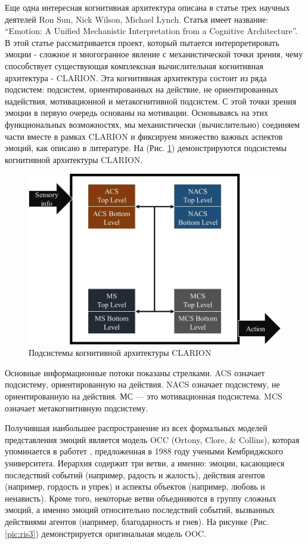 Еще одна интересная когнитивная архитектура описана в статье трех научных деятелей Ron Sun, Nick Wilson, 
Michael Lynch. Статья имеет название: “Emotion: A Unified Mechanistic Interpretation from a Cognitive Architecture”.
В этой статье рассматривается проект, который пытается интерпретировать эмоции - сложное и многогранное явление с 
механистической точки зрения, чему способствует существующая комплексная вычислительная когнитивная архитектура - CLARION.
Эта когнитивная архитектура состоит из ряда подсистем: подсистем, ориентированных на действие, не ориентированных надействия, 
мотивационной и метакогнитивной подсистем. С этой точки зрения эмоции в первую очередь основаны на мотивации.
Основываясь на этих функциональных возможностях, мы механистически (вычислительно) соединяем части вместе 
в рамках CLARION и фиксируем множество важных аспектов эмоций, как описано в литературе. 
На (Рис. \ref{pic:ris2}) демонстрируются подсистемы когнитивной архитектуры CLARION.
\begin{figure}[h]
\includegraphics[width=0.75\columnwidth]{./img/ris2.png}
\centering
\caption{Подсистемы когнитивной архитектуры CLARION}
\label{pic:ris2}
\end{figure}

Основные информационные потоки показаны стрелками. ACS означает подсистему, ориентированную на действия. NACS означает подсистему, не ориентированную на действия. МС — это мотивационная подсистема. MCS означает метакогнитивную подсистему.

Получившая наибольшее распространение из всех формальных моделей представления эмоций является модель OCC (Ortony, Clore, \& Collins), 
которая упоминается в работет \cite{Samsonovich06}, 
предложенная в 1988 году учеными Кембриджского университета. Иерархия содержит три ветви, а именно: эмоции, касающиеся последствий 
событий (например, радость и жалость), действия агентов (например, гордость и упрек) и аспекты объектов (например, любовь и ненависть). 
Кроме того, некоторые ветви объединяются в группу сложных эмоций, а именно эмоций относительно последствий событий, вызванных действиями 
агентов (например, благодарность и гнев). 
На рисунке (Рис. \ref{pic:ris3}) демонстрируется оригинальная модель OOC.

